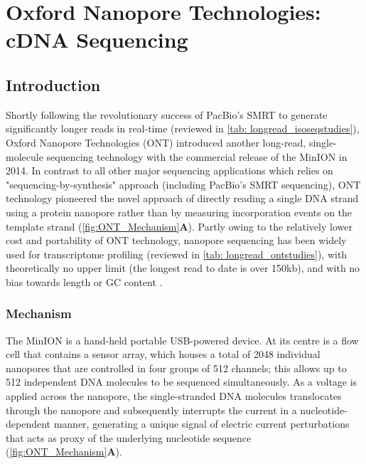 \clearpage

\section{Oxford Nanopore Technologies: cDNA Sequencing}
\label{sec:ONT_cDNA_Sequencing}

\subsection{Introduction}
Shortly following the revolutionary success of PacBio's SMRT to generate significantly longer reads in real-time (reviewed in \cref{tab: longread_isoseqstudies}), Oxford Nanopore Technologies (ONT) introduced another long-read, single-molecule sequencing technology with the commercial release of the MinION in 2014. In contrast to all other major sequencing applications which relies on "sequencing-by-synthesis" approach (including PacBio's SMRT sequencing), ONT technology pioneered the novel approach of directly reading a single DNA strand using a protein nanopore rather than by measuring incorporation events on the template strand\cite{Jain2015} (\cref{fig:ONT_Mechanism}\textbf{A}). Partly owing to the relatively lower cost and portability of ONT technology, nanopore sequencing has been widely used for transcriptome profiling (reviewed in \cref{tab: longread_ontstudies}), 
with theoretically no upper limit \cite{Loman2015} (the longest read to date is over 150kb), and with no bias towards length or GC content \cite{Oikonomopoulos2016, Weirather2017}.


\subsubsection{Mechanism}
The MinION is a hand-held portable USB-powered device. At its centre is a flow cell that contains a sensor array, which houses a total of 2048 individual nanopores that are controlled in four groups of 512 channels; this allows up to 512 independent DNA molecules to be sequenced simultaneously\cite{Jain2015}. As a voltage is applied across the nanopore, the single-stranded DNA molecules translocates through the nanopore and subsequently interrupts the current in a nucleotide-dependent manner, generating a unique signal of electric current perturbations that acts as proxy of the underlying nucleotide sequence (\cref{fig:ONT_Mechanism}\textbf{A}). 

